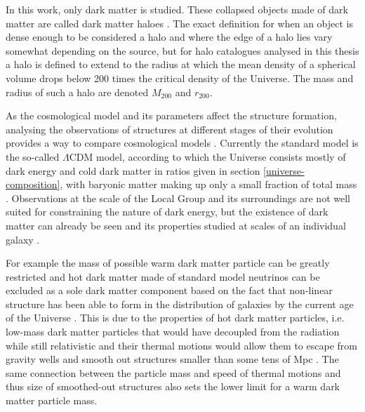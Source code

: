 \documentclass[english, oneside]{HYgradu}
\begin{document}
In this work, only dark matter is studied. These collapsed objects made of dark matter are called dark matter haloes \citep{mo2010galaxy}. The exact definition for when an object is dense enough to be considered a halo and where the edge of a halo lies vary somewhat depending on the source, but for halo catalogues analysed in this thesis a halo is defined to extend to the radius at which the mean density of a spherical volume drops below 200 times the critical density of the Universe. The mass and radius of such a halo are denoted $M_{200}$ and $r_{200}$.

As the cosmological model and its parameters affect the structure formation, analysing the observations of structures at different stages of their evolution provides a way to compare cosmological models \citep{mo2010galaxy}. Currently the standard model is the so-called $\Lambda$CDM model, according to which the Universe consists mostly of dark energy and cold dark matter in ratios given in section \ref{universe-composition}, with baryonic matter making up only a small fraction of total mass \citep{mo2010galaxy}. Observations at the scale of the Local Group and its surroundings are not well suited for constraining the nature of dark energy, but the existence of dark matter can already be seen and its properties studied at scales of an individual galaxy \citep{mo2010galaxy}.

For example the mass of possible warm dark matter particle can be greatly restricted \citep{kennedy2014constraining} and hot dark matter made of standard model neutrinos can be excluded as a sole dark matter component based on the fact that non-linear structure has been able to form in the distribution of galaxies by the current age of the Universe \citep{white1984is}. This is due to the properties of hot dark matter particles, i.e. low-mass dark matter particles that would have decoupled from the radiation while still relativistic  and their thermal motions would allow them to escape from gravity wells and smooth out structures smaller than some tens of Mpc \citep{mo2010galaxy}. The same connection between the particle mass and speed of thermal motions and thus size of smoothed-out structures also sets the lower limit for a warm dark matter particle mass.


\end{document}
